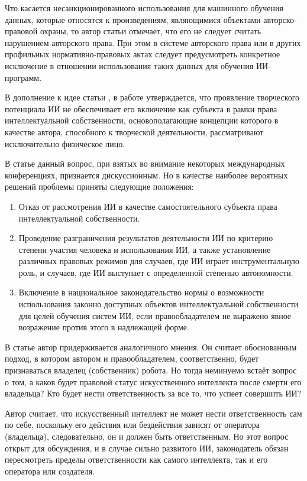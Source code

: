 Что касается несанкционированного использования для машинного обучения данных, которые относятся к произведениям, являющимися
объектами авторско-правовой охраны, то автор статьи \cite{II} отмечает, что его не следует считать нарушением
авторского права. При этом в системе авторского права или в других профильных нормативно-правовых актах
следует предусмотреть конкретное исключение в отношении использования таких данных для обучения ИИ-программ.

В дополнение к идее статьи \cite{II}, в работе \cite{chel} утверждается, что
проявление творческого потенциала ИИ не обеспечивает его включение как субъекта в рамки
права интеллектуальной собственности, основополагающие концепции которого в качестве автора,
способного к творческой деятельности, рассматривают исключительно физическое лицо.

В статье
\cite{chel} данный вопрос, при взятых во внимание некоторых международных конференциях,
признается дискуссионным. Но в качестве наиболее вероятных решений проблемы приняты следующие положения:

\begin{enumerate}
\item Отказ от рассмотрения ИИ в качестве самостоятельного субъекта права интеллектуальной собственности.
\item Проведение разграничения результатов деятельности ИИ по критерию степени участия человека и
использования ИИ, а также установление различных правовых режимов для случаев, где ИИ играет
инструментальную роль, и случаев, где ИИ выступает с определенной степенью автономности.
\item Включение в национальное законодательство нормы о возможности использования законно
доступных объектов интеллектуальной собственности для целей обучения систем ИИ, если
правообладателем не выражено явное возражение против этого в надлежащей форме.
\end{enumerate}

В статье \cite{probs} автор придерживается аналогичного мнения. Он считает
обоснованным подход, в котором автором и правообладателем, соответственно,
будет признаваться владелец (собственник) робота. Но тогда неминуемо встаёт вопрос о том,
а каков будет правовой статус искусственного интеллекта после смерти его владельца?
Кто будет нести ответственность за все то, что успеет совершить ИИ?

Автор считает, что
искусственный интеллект не может нести ответственность сам по себе, поскольку его действия
или бездействия зависят от оператора (владельца), следовательно, он и
должен быть ответственным. Но этот вопрос открыт для обсуждения, и в
случае сильно развитого ИИ, законодатель обязан пересмотреть пределы ответственности
как самого интеллекта, так и его оператора или создателя.

